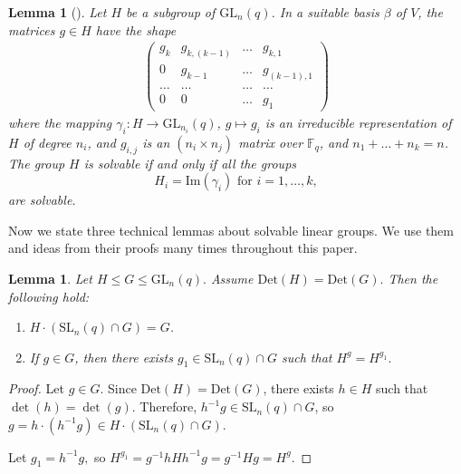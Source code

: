\documentclass[a4paper,reqno,11pt]{amsart}
\newtheorem{Lem}[Th]{Lemma}
\theoremstyle{definition}
\theoremstyle{remark}
\numberwithin{equation}{section}
\newcommand{\Det}{\mathrm{Det}}
\newcommand{\SL}{{\mathrm{SL}}}
\newcommand{\GL}{{\mathrm{GL}}}
\begin{document}
\begin{Lem}[{\cite[\S 18, Theorem 3]{sup}}]
\label{supreduce}
Let  $H$ be a
subgroup of $\GL_n(q)$. In a suitable basis $\beta$ of $V$, the matrices $g\in H$ have the
shape
\begin{gather}\label{stup}
\begin{pmatrix}
g_k     & g_{k,(k-1)} & \ldots & g_{k,1}  \\
0          &    g_{k-1}  & \ldots & g_{(k-1),1}  \\
\ldots     & \ldots     & \ldots & \ldots     \\
      0    &   0        & \ldots & g_1 
\end{pmatrix}
\end{gather}
where the mapping $\gamma_i: H \to \GL_{n_i}(q)$, $g \mapsto g_i$ is an irreducible 
representation of $H$ of degree $n_i$, and $g_{i,j}$ is an $(n_i \times n_j)$ matrix over $\mathbb{F}_q$, and $n _1 + \ldots + n _k = n$.
 The group $H$  is solvable if and only if all the
groups
$$H_i ={\mathrm{Im} } (\gamma_i) \text{ for } i = 1, \ldots, k,$$
are solvable.
\end{Lem}

 Now we state three technical lemmas about solvable linear groups. We use them and ideas from their proofs many times throughout  this paper. 

\begin{Lem}\label{supSL}
Let $H \le G \le \GL_n(q).$ Assume $\Det(H)=\Det(G).$ Then the following hold:
\begin{enumerate}[font=\normalfont]
\item $H \cdot (\SL_n(q) \cap G)=G$.
\item If $g \in G$, then there exists $g_1 \in \SL_n(q) \cap G$ such that $H^g=H^{g_1}.$ 
\end{enumerate}
\end{Lem}
\begin{proof}
Let $g \in G$. Since $\Det(H)=\Det(G)$, there exists $h \in H$ such that $\det(h)=\det(g).$ Therefore, 
$h^{-1}g \in \SL_n(q) \cap G$, so $g=h \cdot (h^{-1}g)\in H \cdot (\SL_n(q) \cap G).$

Let $g_1=h^{-1}g,$ so $H^{g_1}=g^{-1}hHh^{-1}g=g^{-1}Hg=H^g.$
\end{proof}
\end{document}
